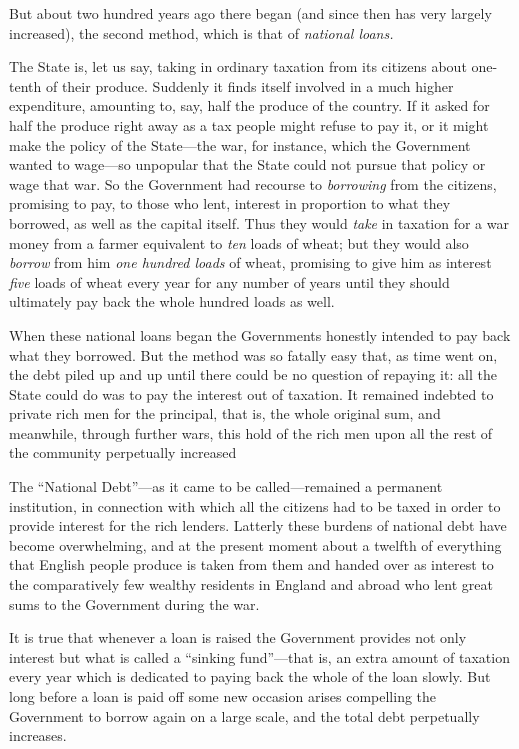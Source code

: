 \documentclass{book}
\begin{document}
But about two hundred years ago there began (and since then has very largely increased), the second method, which is that of \emph{national loans.}

The State is, let us say, taking in ordinary taxation from its citizens about one-tenth of their produce. Suddenly it finds itself involved in a much higher expenditure, amounting to, say, half the produce of the country. If it asked for half the produce right away as a tax people might refuse to pay it, or it might make the policy of the State—the war, for instance, which the Government wanted to wage—so unpopular that the State could not pursue that policy or wage that war. So the Government had recourse to \emph{borrowing} from the citizens, promising to pay, to those who lent, interest in proportion to what they borrowed, as well as the capital itself. Thus they would \emph{take} in taxation for a war money from a farmer equivalent to \emph{ten} loads of wheat; but they would also \emph{borrow} from him \emph{one hundred loads} of wheat, promising to give him as interest \emph{five} loads of wheat every year for any number of years until they should ultimately pay back the whole hundred loads as well.

When these national loans began the Governments honestly intended to pay back what they borrowed. But the method was so fatally easy that, as time went on, the debt piled up and up until there could be no question of repaying it: all the State could do was to pay the interest out of taxation. It remained indebted to private rich men for the principal, that is, the whole original sum, and meanwhile, through further wars, this hold of the rich men upon all the rest of the community perpetually increased

The “National Debt”—as it came to be called—remained a permanent institution, in connection with which all the citizens had to be taxed in order to provide interest for the rich lenders. Latterly these burdens of national debt have become overwhelming, and at the present moment about a twelfth of everything that English people produce is taken from them and handed over as interest to the comparatively few wealthy residents in England and abroad who lent great sums to the Government during the war.

It is true that whenever a loan is raised the Government provides not only interest but what is called a “sinking fund”—that is, an extra amount of taxation every year which is dedicated to paying back the whole of the loan slowly. But long before a loan is paid off some new occasion arises compelling the Government to borrow again on a large scale, and the total debt perpetually increases.
\end{document}
